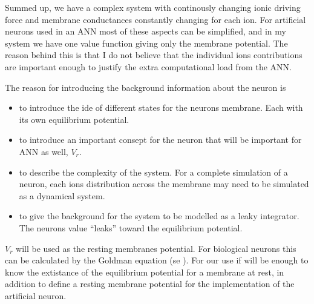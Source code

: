 Summed up, we have a complex system with continously changing ionic driving force and membrane conductances constantly changing for each ion. 
For artificial neurons used in an ANN most of these aspects can be simplified, and in my system we have one value function giving only the membrane potential. 
The reason behind this is that I do not believe that the individual ions contributions are important enough to justify the extra computational load from the ANN. 






The reason for introducing the background information about the neuron is  %
\begin{itemize}
	\item to introduce the ide of different states for the neurons membrane. Each with its own equilibrium potential.
	\item to introduce an important consept for the neuron that will be important for ANN as well, $V_{r}$.
	\item to describe the complexity of the system. For a complete simulation of a neuron, each ions distribution across the membrane may need to be simulated as a dynamical system.
	\item to give the background for the system to be modelled as a leaky integrator. The neurons value ``leaks'' toward the equilibrium potential.
\end{itemize}

$V_{r}$ will be used as the resting membranes potential. For biological neurons this can be calculated by the Goldman equation (se \cite{PrinciplesOfNeuralScience4edKAP07}). 
For our use if will be enough to know the extistance of the equilibrium potential for a membrane at rest,
in addition to define a resting membrane potential for the implementation of the artificial neuron.





